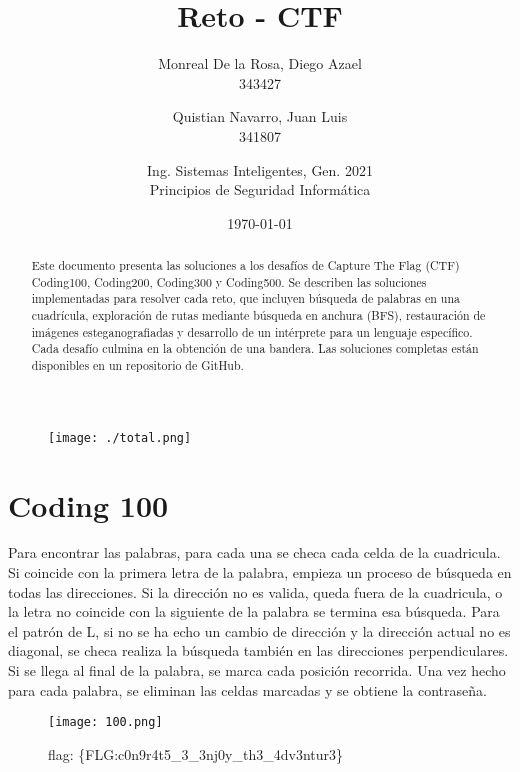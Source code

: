 \documentclass{article}
\title{Reto - CTF}
\author{
	Monreal De la Rosa, Diego Azael\\
	343427
	\and
	Quistian Navarro, Juan Luis\\
	341807
	\and
	Ing. Sistemas Inteligentes, Gen. 2021\\
	Principios de Seguridad Informática
}
\date{\today}
\begin{document}
\maketitle

\begin{abstract}
  Este documento presenta las soluciones a los desafíos de Capture The Flag (CTF) Coding100, Coding200, Coding300 y Coding500. Se describen las soluciones implementadas para resolver cada reto, que incluyen búsqueda de palabras en una cuadrícula, exploración de rutas mediante búsqueda en anchura (BFS), restauración de imágenes esteganografiadas y desarrollo de un intérprete para un lenguaje específico. Cada desafío culmina en la obtención de una bandera. Las soluciones completas están disponibles en un repositorio de GitHub.
\end{abstract}

\begin{figure}[H]
  \centering
  \texttt{[image: ./total.png]}
  \caption{}
\end{figure}

\newpage
\section*{Coding 100}

Para encontrar las palabras, para cada una se checa cada celda de la cuadricula. Si coincide con la primera letra de la palabra, empieza un proceso de búsqueda en todas las direcciones. Si la dirección no es valida, queda fuera de la cuadricula, o la letra no coincide con la siguiente de la palabra se termina esa búsqueda. Para el patrón de L, si no se ha echo un cambio de dirección y la dirección actual no es diagonal, se checa realiza la búsqueda también en las direcciones perpendiculares. Si se llega al final de la palabra, se marca cada posición recorrida. Una vez hecho para cada palabra, se eliminan las celdas marcadas y se obtiene la contraseña.

\begin{figure}[H]
  \centering
  \texttt{[image: 100.png]}
  \caption{flag: \{FLG:c0n9r4t5\_3\_3nj0y\_th3\_4dv3ntur3\}}
\end{figure}
\end{document}
